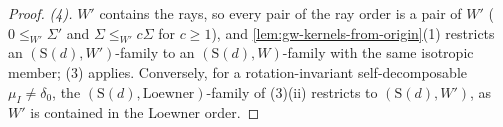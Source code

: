 \begin{proof}
\emph{(4).} $W'$ contains the rays, so every pair of the ray order is a pair of $W'$ ($0 \le_{W'} \Sigma'$
and $\Sigma \le_{W'} c\Sigma$ for $c \ge 1$), and \ref{lem:gw-kernels-from-origin}(1) restricts an
$(\mathrm S(d), W')$-family to an $(\mathrm S(d), W)$-family with the same isotropic member; (3) applies.
Conversely, for a rotation-invariant self-decomposable $\mu_I \ne \delta_0$, the
$(\mathrm S(d), \text{Loewner})$-family of (3)(ii) restricts to $(\mathrm S(d), W')$, as $W'$ is contained
in the Loewner order.
\end{proof}


